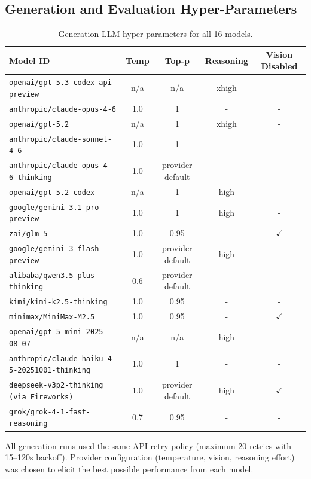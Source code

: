 \subsection{Generation and Evaluation Hyper-Parameters}
\label{hyperparams}
\begin{table}[!h]
\caption{Generation LLM hyper-parameters for all 16 models.}
\label{tab:generation_hparams_ranked}
\small
\begin{tabular}{@{}p{6.0cm} c c c c@{}}
\toprule
\textbf{Model ID} & \textbf{Temp} & \textbf{Top-p} & \textbf{Reasoning} & \textbf{Vision Disabled} \\
\midrule
\texttt{openai/gpt-5.3-codex-api-preview} & n/a & n/a & xhigh & - \\
\texttt{anthropic/claude-opus-4-6} & 1.0 & 1 & - & - \\
\texttt{openai/gpt-5.2} & n/a & 1 & xhigh & - \\
\texttt{anthropic/claude-sonnet-4-6} & 1.0 & 1 & - & - \\
\texttt{anthropic/claude-opus-4-6-thinking} & 1.0 & provider default & - & - \\
\texttt{openai/gpt-5.2-codex} & n/a & 1 & high & - \\
\texttt{google/gemini-3.1-pro-preview} & 1.0 & 1 & high & - \\
\texttt{zai/glm-5} & 1.0 & 0.95 & - & $\checkmark$ \\
\texttt{google/gemini-3-flash-preview} & 1.0 & provider default & high & - \\
\texttt{alibaba/qwen3.5-plus-thinking} & 0.6 & provider default & - & - \\
\texttt{kimi/kimi-k2.5-thinking} & 1.0 & 0.95 & - & - \\
\texttt{minimax/MiniMax-M2.5} & 1.0 & 0.95 & - & $\checkmark$ \\
\texttt{openai/gpt-5-mini-2025-08-07} & n/a & n/a & high & - \\
\texttt{anthropic/claude-haiku-4-5-20251001-thinking} & 1.0 & 1 & - & - \\
\texttt{deepseek-v3p2-thinking (via Fireworks)} & 1.0 & provider default & high & $\checkmark$ \\
\texttt{grok/grok-4-1-fast-reasoning} & 0.7 & 0.95 & - & - \\
\bottomrule
\end{tabular}
\end{table}

All generation runs used the same API retry policy (maximum 20 retries with 15--120s backoff). Provider configuration (temperature, vision, reasoning effort) was chosen to elicit the best possible performance from each model.


